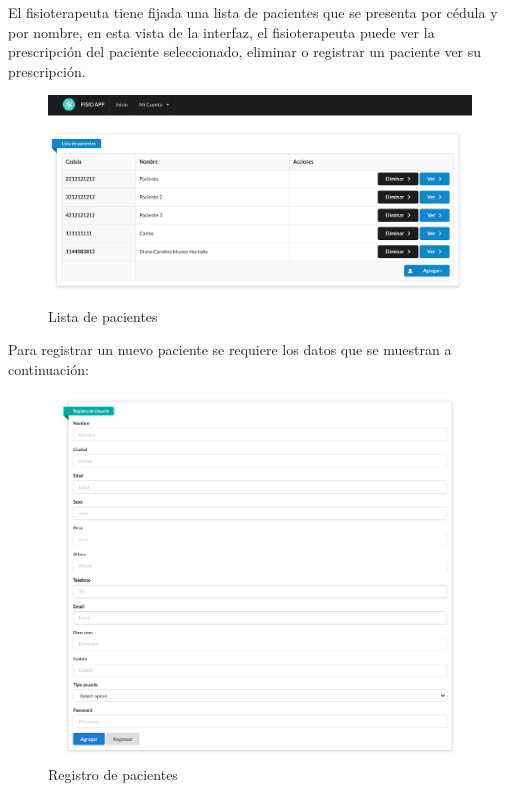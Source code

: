 \documentclass[12pt]{article}
\begin{document}
El fisioterapeuta tiene fijada una lista de pacientes que se presenta por cédula y por nombre, en esta vista de la interfaz, el fisioterapeuta puede ver la prescripción del paciente seleccionado, eliminar o registrar un paciente ver su prescripción.

\begin{figure}[ht]
\centering
\includegraphics[scale=0.36]{imag/listpacientes.png}
\caption{Lista de pacientes}
\label{6}
\end{figure}
\FloatBarrier

Para registrar un nuevo paciente se requiere los datos que se muestran a continuación:

\begin{figure}[ht]
\centering
\includegraphics[scale=0.4]{imag/registrousaapp.png}
\caption{Registro de pacientes}
\label{6}
\end{figure}
\FloatBarrier
\end{document}
